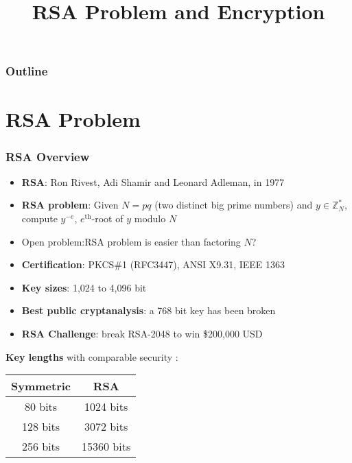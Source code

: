 

\title{RSA Problem and Encryption}


\maketitle
\begin{frame}
\frametitle{Outline}
\tableofcontents
\end{frame}
\section{RSA Problem}
\begin{frame}\frametitle{RSA Overview}
\begin{itemize}
\item \textbf{RSA}: Ron Rivest, Adi Shamir and Leonard Adleman, in 1977
\item \textbf{RSA problem}: Given $N = pq$ (two distinct big prime numbers) and $y \in \mathbb{Z}^*_N$, compute $y^{-e}$, $e^{\text{th}}$-root of $y$ modulo $N$
\item \alert{Open problem}:RSA problem is easier than factoring $N$?
\item \textbf{Certification}: PKCS\#1 (RFC3447), ANSI X9.31, IEEE 1363
\item \textbf{Key sizes}: 1,024 to 4,096 bit
\item \textbf{Best public cryptanalysis}: a 768 bit key has been broken
\item \textbf{RSA Challenge}: break RSA-2048 to win \$200,000 USD
\end{itemize}
\textbf{Key lengths} with comparable security :
\begin{center}
\begin{tabular}{|c|c|} \hline
Symmetric & RSA  \\ \hline
80 bits & 1024 bits   \\
128 bits & 3072 bits  \\
256 bits & 15360 bits \\ \hline
\end{tabular}	
\end{center}
\end{frame}
